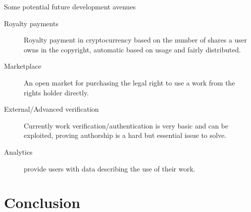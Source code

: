 \documentclass[12pt]{article}
\begin{document}
Some potential future development avenues

\begin{description}
	\item[Royalty payments] Royalty payment in cryptocurrency based on the number of shares a user owns in the copyright, automatic based on usage and fairly distributed.
	\item[Marketplace] An open market for purchasing the legal right to use a work from the rights holder directly.
	\item[External/Advanced verification] Currently work verification/authentication is very basic and can be exploited, proving authorship is a hard but essential issue to solve.
	\item[Analytics] provide users with data describing the use of their work.
\end{description}

\section{Conclusion}

%



\end{document}
